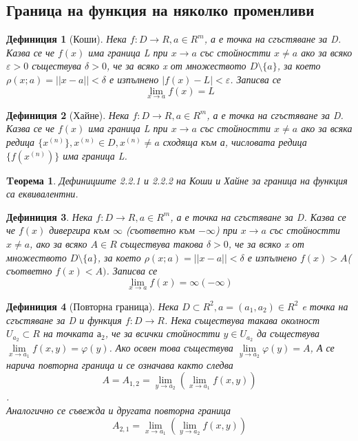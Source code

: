 \documentclass[fleqn]{article}
\newtheorem{theorem}{Tеорема}[subsection]
\newtheorem{definition}{Дефиниция}[subsection]
\begin{document}
\subsection{Граница на функция на няколко променливи}
	\begin{definition}[Коши]
Нека $f: D \rightarrow R, a \in R^m$, а е точка на сгъстяване за D. Казва се че $f(x)$ има граница L при $x \rightarrow a$ със стойностти $x \neq a$ ако за всяко $\varepsilon > 0$ съществува $\delta > 0$, че за всяко x от множеството $D \setminus \{a\}$, за което $\rho(x;a) = || x - a || < \delta $ е изпълнено $|f(x) - L | < \varepsilon$. Записва се $$\lim\limits_{x \rightarrow a} f(x) = L$$
	\end{definition}

	\begin{definition}[Хайне]
Нека $f: D \rightarrow R, a \in R^m$, а е точка на сгъстяване за D. Казва се че $f(x)$ има граница L при $x \rightarrow a$ със стойностти $x \neq a$ ако за всяка редица  $\{x^{(n)}\} ,x^{(n)} \in D, x^{(n)} \neq a$ сходяща към а, числовата редица $\{f(x^{(n)})\}$ има граница L. 
	\end{definition}

	\begin{theorem}
Дефинициите 2.2.1 и 2.2.2 на Коши и Хайне за граница на функция са еквивалентни.
	\end{theorem}

	\begin{definition}
Нека $f: D \rightarrow R, a \in R^m$, а е точка на сгъстяване за D. Казва се че $f(x)$ дивергира към $\infty$ (съответно към $-\infty$) при $x \rightarrow a$ със стойностти $x \neq a$, ако за всяко $A \in R$ съществува такова $\delta > 0$, че за всяко x от множеството $D \setminus \{a\}$, за което $\rho(x;a) = || x - a || < \delta $ е изпълнено $f(x) > A $( съответно $f(x) < A)$. Записва се
 $$\lim\limits_{x \rightarrow a} f(x) = \infty (-\infty) $$ 
	\end{definition}

	\begin{definition}[Повторна граница]
Нека $D \subset R^2, a = (a_1, a_2) \in R^2$ e точка на сгъстяване за D и функция $f: D \rightarrow R$. Нека съществува такава околност $U_{a_2} \subset R$ на точката $а_2$, че за всички стойностти $y \in U_{a_2} $ да съществува  $\lim\limits_{x \rightarrow a_1} f(x,y) = \varphi (y)$. Ако освен това съществува $\lim\limits_{y \rightarrow a_2} \varphi (y) = A$, А се нарича повторна граница и се означава както следва 
$$A = A_{1,2} =\lim\limits_{y \rightarrow a_2} (\lim\limits_{x \rightarrow a_1} f(x,y) ) $$.\\
Аналогично се съвежда и другата повторна граница 
$$ A_{2,1} = \lim\limits_{x \rightarrow a_1} (\lim\limits_{y \rightarrow a_2} f(x,y) ) $$
	\end{definition}
\end{document}
